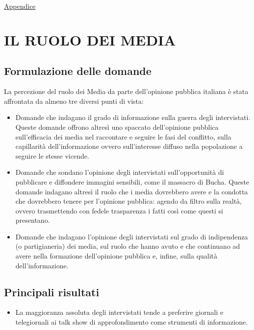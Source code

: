 \documentclass[
  openany]{book}
\providecommand{\tightlist}{%
  \setlength{\itemsep}{0pt}\setlength{\parskip}{0pt}}
\begin{document}
\href{https://github.com/LucianaFazio/Ucrania/blob/main/PDF_Appendice/VII.\%20Il\%20clima\%20di\%20opinione\%20v.3.pdf}{Appendice}

\hypertarget{il-ruolo-dei-media}{%
\chapter{IL RUOLO DEI MEDIA}\label{il-ruolo-dei-media}}

\hypertarget{formulazione-delle-domande-6}{%
\section{Formulazione delle domande}\label{formulazione-delle-domande-6}}

La percezione del ruolo dei Media da parte dell'opinione pubblica italiana è stata affrontata da almeno tre diversi punti di vista:

\begin{itemize}
\item
  Domande che indagano il grado di informazione sulla guerra degli intervistati. Queste domande offrono altresì uno spaccato dell'opinione pubblica sull'efficacia dei media nel raccontare e seguire le fasi del conflitto, sulla capillarità dell'informazione ovvero sull'interesse diffuso nella popolazione a seguire le stesse vicende.
\item
  Domande che sondano l'opinione degli intervistati sull'opportunità di pubblicare e diffondere immagini sensibili, come il massacro di Bucha. Queste domande indagano altresì il ruolo che i media dovrebbero avere e la condotta che dovrebbero tenere per l'opinione pubblica: agendo da filtro sulla realtà, ovvero trasmettendo con fedele trasparenza i fatti così come questi si presentano.
\item
  Domande che indagano l'opinione degli intervistati sul grado di indipendenza (o partigianeria) dei media, sul ruolo che hanno avuto e che continuano ad avere nella formazione dell'opinione pubblica e, infine, sulla qualità dell'informazione.
\end{itemize}

\hypertarget{principali-risultati-6}{%
\section{Principali risultati}\label{principali-risultati-6}}

\begin{itemize}
\tightlist
\item
  La maggioranza assoluta degli intervistati tende a preferire giornali e telegiornali ai talk show di approfondimento come strumenti di informazione.
\end{itemize}
\end{document}
